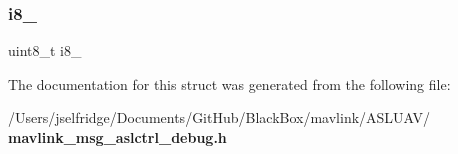 \subsubsection{i8\+\_}
{\footnotesize\ttfamily uint8\+\_\+t i8\+\_}



The documentation for this struct was generated from the following file\+:\begin{DoxyCompactItemize}
\item 
/\+Users/jselfridge/\+Documents/\+Git\+Hub/\+Black\+Box/mavlink/\+A\+S\+L\+U\+A\+V/\textbf{ mavlink\+\_\+msg\+\_\+aslctrl\+\_\+debug.\+h}\end{DoxyCompactItemize}
